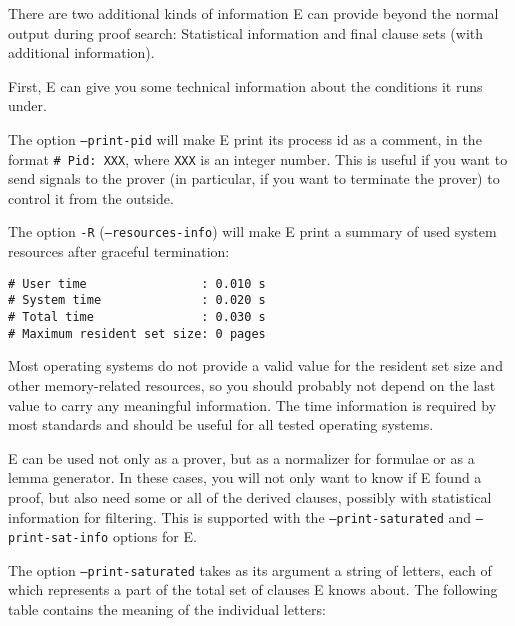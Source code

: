 \documentclass{report}
\begin{document}
There are two additional kinds of information E can provide beyond the
normal output during proof search: Statistical information and final
clause sets (with additional information).

First, E can give you some technical information about the conditions
it runs under.

The option \texttt{--print-pid} will make E print its process id as a
comment, in the format \texttt{\# Pid: XXX}, where \texttt{XXX} is an
integer number. This is useful if you want to send signals to the
prover (in particular, if you want to terminate the prover) to control
it from the outside.

The option \texttt{-R} (\texttt{--resources-info}) will make E print a
summary of used system resources after graceful termination:

\begin{verbatim}
# User time                : 0.010 s
# System time              : 0.020 s
# Total time               : 0.030 s
# Maximum resident set size: 0 pages
\end{verbatim}

Most operating systems do not provide a valid value for the resident
set size and other memory-related resources, so you should probably
not depend on the last value to carry any meaningful information. The
time information is required by most standards and should be useful
for all tested operating systems.

E can be used not only as a prover, but as a normalizer for formulae
or as a lemma generator. In these cases, you will not only want to know
if E found a proof, but also need some or all of the derived clauses,
possibly with statistical information for filtering. This is supported
with the \texttt{--print-saturated} and \texttt{--print-sat-info}
options for E.

The option \texttt{--print-saturated} takes as its argument a string
of letters, each of which represents a part of the total set of
clauses E knows about. The following table contains the meaning of the
individual letters:
\end{document}
